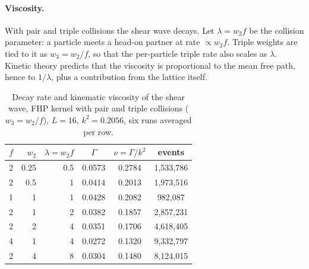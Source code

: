 \documentclass[11pt,a4paper]{article}
\theoremstyle{plain}
\theoremstyle{definition}
\theoremstyle{remark}
\begin{document}
\paragraph{Viscosity.}
With pair and triple collisions the shear wave decays. Let
$\lambda = w_2f$ be the collision parameter: a particle meets a head-on partner
at rate $\propto w_2f$. Triple weights are tied to it as $w_3=w_2/f$, so that
the per-particle triple rate also scales as $\lambda$. Kinetic theory predicts
that the viscosity is proportional to the mean free path, hence to
$1/\lambda$, plus a contribution from the lattice itself.

\begin{table}[ht]
\centering
\begin{tabular}{rrrccc}
\toprule
$f$ & $w_2$ & $\lambda=w_2f$ & $\Gamma$ & $\nu=\Gamma/k^2$ & events\\
\midrule
2 & 0.25 & 0.5 & 0.0573 & 0.2784 & 1{,}533{,}786\\
2 & 0.5 & 1 & 0.0414 & 0.2013 & 1{,}973{,}516\\
1 & 1 & 1 & 0.0428 & 0.2082 & 982{,}087\\
2 & 1 & 2 & 0.0382 & 0.1857 & 2{,}857{,}231\\
2 & 2 & 4 & 0.0351 & 0.1706 & 4{,}618{,}405\\
4 & 1 & 4 & 0.0272 & 0.1320 & 9{,}332{,}797\\
2 & 4 & 8 & 0.0304 & 0.1480 & 8{,}124{,}015\\
\bottomrule
\end{tabular}
\caption{Decay rate and kinematic viscosity of the shear wave, FHP kernel with
pair and triple collisions ($w_3=w_2/f$), $L=16$, $k^2=0.2056$, six runs
averaged per row.}
\label{tab:viscosity}
\end{table}
\end{document}
